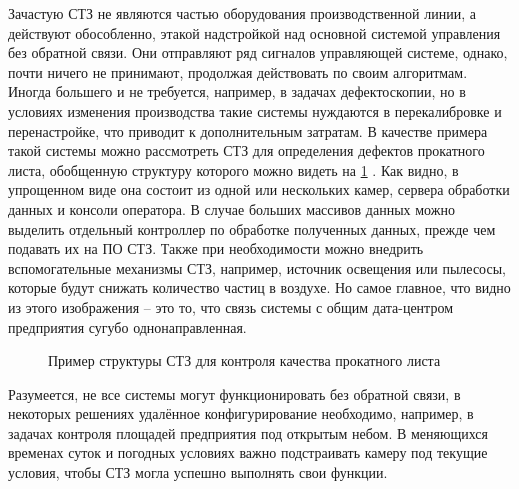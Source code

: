 Зачастую СТЗ не являются частью оборудования производственной линии, а действуют обособленно, этакой надстройкой над основной системой управления без обратной связи. Они отправляют ряд сигналов управляющей системе, однако, почти ничего не принимают, продолжая действовать по своим алгоритмам. Иногда большего и не требуется, например, в задачах дефектоскопии, но в условиях изменения производства такие системы нуждаются в перекалибровке и перенастройке, что приводит к дополнительным затратам. В качестве примера такой системы можно рассмотреть СТЗ для определения дефектов прокатного листа, обобщенную структуру которого можно видеть на \cref{fig:cv-line} \cite{web:defect}. Как видно, в упрощенном виде она состоит из одной или нескольких камер, сервера обработки данных и консоли оператора. В случае больших массивов данных можно выделить отдельный контроллер по обработке полученных данных, прежде чем подавать их на ПО СТЗ. Также при необходимости можно внедрить вспомогательные механизмы СТЗ, например, источник освещения или пылесосы, которые будут снижать количество частиц в воздухе. Но самое главное, что видно из этого изображения -- это то, что связь системы с общим дата-центром предприятия сугубо однонаправленная.

\begin{figure}[ht]
	\caption{Пример структуры СТЗ для контроля качества прокатного листа}\label{fig:cv-line}
\end{figure}

Разумеется, не все системы могут функционировать без обратной связи, в некоторых решениях удалённое конфигурирование необходимо, например, в задачах контроля площадей предприятия под открытым небом. В меняющихся временах суток и погодных условиях важно подстраивать камеру под текущие условия, чтобы СТЗ могла успешно выполнять свои функции.

